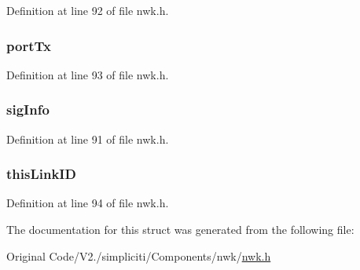 \-Definition at line 92 of file nwk.\-h.

\hypertarget{structconnInfo__t_ad86d0317b274fcbe4afb501072a6483f}{
\subsubsection[{port\-Tx}]{ {\bf port\-Tx}}}\label{structconnInfo__t_ad86d0317b274fcbe4afb501072a6483f}


\-Definition at line 93 of file nwk.\-h.

\hypertarget{structconnInfo__t_a87903a190e749b4aa6e73a2aa5d18ff1}{
\subsubsection[{sig\-Info}]{ {\bf sig\-Info}}}\label{structconnInfo__t_a87903a190e749b4aa6e73a2aa5d18ff1}


\-Definition at line 91 of file nwk.\-h.

\hypertarget{structconnInfo__t_aa316c2271456d83341ee386bf74e558f}{
\subsubsection[{this\-Link\-I\-D}]{ {\bf this\-Link\-I\-D}}}\label{structconnInfo__t_aa316c2271456d83341ee386bf74e558f}


\-Definition at line 94 of file nwk.\-h.



\-The documentation for this struct was generated from the following file\-:\begin{DoxyCompactItemize}
\item 
\-Original Code/\-V2./simpliciti/\-Components/nwk/\hyperlink{nwk_8h}{nwk.\-h}\end{DoxyCompactItemize}
